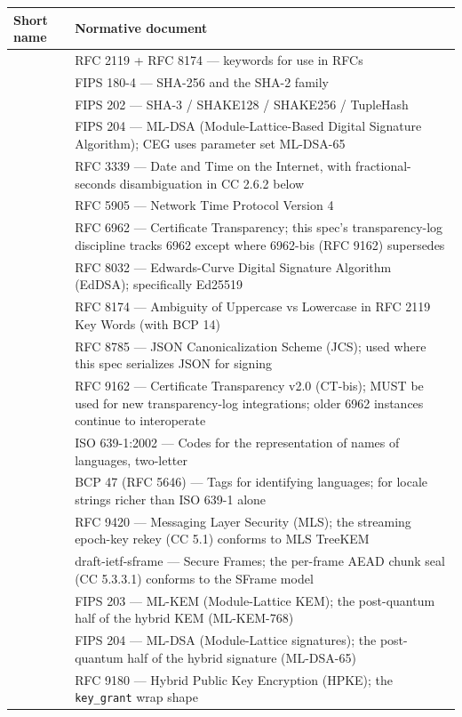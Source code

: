 \documentclass[11pt]{article}
\begin{document}
{\footnotesize
\begin{longtable}{|p{8.0cm}|p{8.0cm}|}\hline
\textbf{Short name} & \textbf{Normative document} \\ \hline\endhead
[BCP 14] & RFC 2119 + RFC 8174 — keywords for use in RFCs \\ \hline
[FIPS-180-4] & FIPS 180-4 — SHA-256 and the SHA-2 family \\ \hline
[FIPS-202] & FIPS 202 — SHA-3 / SHAKE128 / SHAKE256 / TupleHash \\ \hline
[FIPS-204] & FIPS 204 — ML-DSA (Module-Lattice-Based Digital Signature Algorithm); CEG uses parameter set ML-DSA-65 \\ \hline
[RFC-3339] & RFC 3339 — Date and Time on the Internet, with fractional-seconds disambiguation in CC 2.6.2 below \\ \hline
[RFC-5905] & RFC 5905 — Network Time Protocol Version 4 \\ \hline
[RFC-6962] & RFC 6962 — Certificate Transparency; this spec's transparency-log discipline tracks 6962 except where 6962-bis (RFC 9162) supersedes \\ \hline
[RFC-8032] & RFC 8032 — Edwards-Curve Digital Signature Algorithm (EdDSA); specifically Ed25519 \\ \hline
[RFC-8174] & RFC 8174 — Ambiguity of Uppercase vs Lowercase in RFC 2119 Key Words (with BCP 14) \\ \hline
[RFC-8785] & RFC 8785 — JSON Canonicalization Scheme (JCS); used where this spec serializes JSON for signing \\ \hline
[RFC-9162] & RFC 9162 — Certificate Transparency v2.0 (CT-bis); MUST be used for new transparency-log integrations; older 6962 instances continue to interoperate \\ \hline
[ISO-639-1] & ISO 639-1:2002 — Codes for the representation of names of languages, two-letter \\ \hline
[BCP-47] & BCP 47 (RFC 5646) — Tags for identifying languages; for locale strings richer than ISO 639-1 alone \\ \hline
[RFC-9420] & RFC 9420 — Messaging Layer Security (MLS); the streaming epoch-key rekey (CC 5.1) conforms to MLS TreeKEM \\ \hline
[SFrame] & draft-ietf-sframe — Secure Frames; the per-frame AEAD chunk seal (CC 5.3.3.1) conforms to the SFrame model \\ \hline
[FIPS-203] & FIPS 203 — ML-KEM (Module-Lattice KEM); the post-quantum half of the hybrid KEM (ML-KEM-768) \\ \hline
[FIPS-204] & FIPS 204 — ML-DSA (Module-Lattice signatures); the post-quantum half of the hybrid signature (ML-DSA-65) \\ \hline
[RFC-9180] & RFC 9180 — Hybrid Public Key Encryption (HPKE); the \texttt{key\_grant} wrap shape \\ \hline
\end{longtable}}
\end{document}
